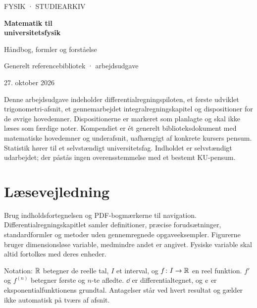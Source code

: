 \documentclass[11pt,a4paper,oneside]{book}
\begin{document}
\frontmatter
\begin{titlepage}
\centering
\vspace*{28mm}
{\sffamily\color{arkivblaa}\Large FYSIK · STUDIEARKIV\par}
\vspace{16mm}
{\Huge\bfseries Matematik til\\[5mm]universitetsfysik\par}
\vspace{12mm}
{\Large Håndbog, formler og forståelse\par}
\vfill
{\large Generelt referencebibliotek · arbejdsudgave\par}
\vspace{4mm}
{\large 27. oktober 2026\par}
\vspace{14mm}
\begin{minipage}{0.83\textwidth}
Denne arbejdsudgave indeholder differentialregningspiloten, et første udviklet trigonometri-afsnit, et gennemarbejdet integralregningskapitel og dispositioner for de øvrige hovedemner. Dispositionerne er markeret som planlagte og skal ikke læses som færdige noter. Kompendiet er ét generelt biblioteksdokument med matematiske hovedemner og underafsnit, uafhængigt af konkrete kursers pensum. Statistik hører til et selvstændigt universitetsfag. Indholdet er selvstændigt udarbejdet; der påstås ingen overensstemmelse med et bestemt KU-pensum.
\end{minipage}
\end{titlepage}
\chapter*{Læsevejledning}
Brug indholdsfortegnelsen og PDF-bogmærkerne til navigation. Differentialregningskapitlet samler definitioner, præcise forudsætninger, standardformler og metoder uden gennemregnede opgaveeksempler. Figurerne bruger dimensionsløse variable, medmindre andet er angivet. Fysiske variable skal altid fortolkes med deres enheder.

Notation: $\mathbb{R}$ betegner de reelle tal, $I$ et interval, og $f\colon I\to\mathbb{R}$ en reel funktion. $f'$ og $f^{(n)}$ betegner første og $n$-te afledte. $\dd$ er differentialtegnet, og $\mathrm{e}$ er eksponentialfunktionens grundtal. Antagelser står ved hvert resultat og gælder ikke automatisk på tværs af afsnit.
\end{document}
